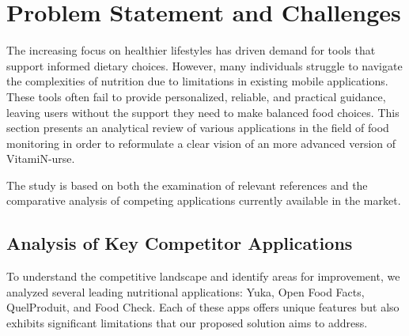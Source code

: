 \section{Problem Statement and Challenges}

The increasing focus on healthier lifestyles has driven demand for tools that support informed dietary choices. However, many individuals struggle to navigate the complexities of nutrition due to limitations in existing mobile applications. These tools often fail to provide personalized, reliable, and practical guidance, leaving users without the support they need to make balanced food choices. This section presents an analytical review of various applications in the field of food monitoring in order to reformulate a clear vision of an more advanced version of \mbox{VitamiN-urse}. 

\par The study is based on both the examination of relevant references and the comparative analysis of competing applications currently available in the market.


\subsection{Analysis of Key Competitor Applications}
To understand the competitive landscape and identify areas for improvement, we analyzed several leading nutritional applications: Yuka, Open
Food Facts, QuelProduit, and Food Check. Each of these apps offers
unique features but also exhibits significant limitations that our proposed
solution aims to address.

